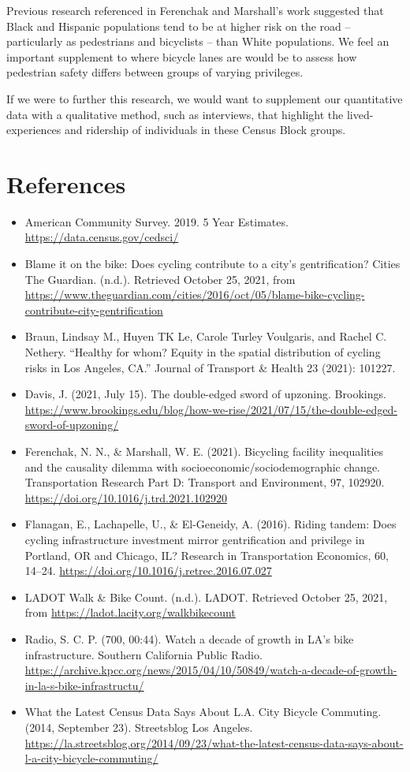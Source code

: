 \documentclass[
]{article}
\begin{document}
Previous research referenced in Ferenchak and Marshall's work suggested
that Black and Hispanic populations tend to be at higher risk on the
road -- particularly as pedestrians and bicyclists -- than White
populations. We feel an important supplement to where bicycle lanes are
would be to assess how pedestrian safety differs between groups of
varying privileges.

If we were to further this research, we would want to supplement our
quantitative data with a qualitative method, such as interviews, that
highlight the lived-experiences and ridership of individuals in these
Census Block groups.

\hypertarget{references}{%
\section{References}\label{references}}

\begin{itemize}
\item
  American Community Survey. 2019. 5 Year Estimates.
  \url{https://data.census.gov/cedsci/}
\item
  Blame it on the bike: Does cycling contribute to a city's
  gentrification? \textbar{} Cities \textbar{} The Guardian. (n.d.).
  Retrieved October 25, 2021, from
  \url{https://www.theguardian.com/cities/2016/oct/05/blame-bike-cycling-contribute-city-gentrification}
\item
  Braun, Lindsay M., Huyen TK Le, Carole Turley Voulgaris, and Rachel C.
  Nethery. ``Healthy for whom? Equity in the spatial distribution of
  cycling risks in Los Angeles, CA.'' Journal of Transport \& Health 23
  (2021): 101227.
\item
  Davis, J. (2021, July 15). The double-edged sword of upzoning.
  Brookings.
  \url{https://www.brookings.edu/blog/how-we-rise/2021/07/15/the-double-edged-sword-of-upzoning/}
\item
  Ferenchak, N. N., \& Marshall, W. E. (2021). Bicycling facility
  inequalities and the causality dilemma with
  socioeconomic/sociodemographic change. Transportation Research Part D:
  Transport and Environment, 97, 102920.
  \url{https://doi.org/10.1016/j.trd.2021.102920}
\item
  Flanagan, E., Lachapelle, U., \& El-Geneidy, A. (2016). Riding tandem:
  Does cycling infrastructure investment mirror gentrification and
  privilege in Portland, OR and Chicago, IL? Research in Transportation
  Economics, 60, 14--24.
  \url{https://doi.org/10.1016/j.retrec.2016.07.027}
\item
  LADOT Walk \& Bike Count. (n.d.). LADOT. Retrieved October 25, 2021,
  from \url{https://ladot.lacity.org/walkbikecount}
\item
  Radio, S. C. P. (700, 00:44). Watch a decade of growth in LA's bike
  infrastructure. Southern California Public Radio.
  \url{https://archive.kpcc.org/news/2015/04/10/50849/watch-a-decade-of-growth-in-la-s-bike-infrastructu/}
\item
  What the Latest Census Data Says About L.A. City Bicycle Commuting.
  (2014, September 23). Streetsblog Los Angeles.
  \url{https://la.streetsblog.org/2014/09/23/what-the-latest-census-data-says-about-l-a-city-bicycle-commuting/}
\end{itemize}
\end{document}

